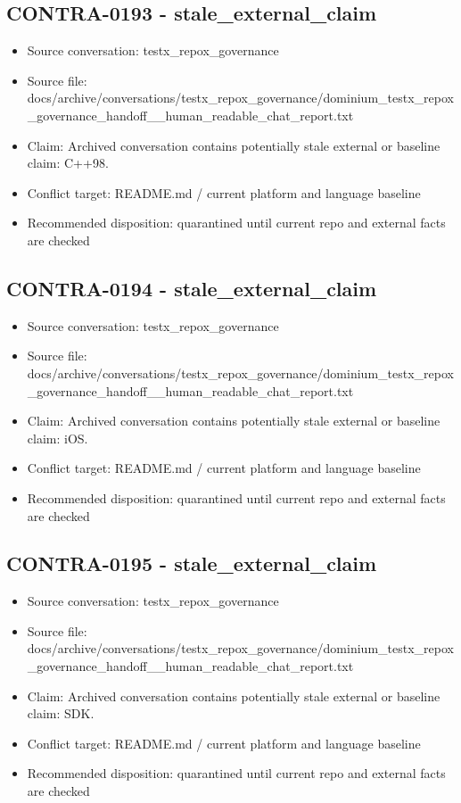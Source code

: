 \documentclass[11pt,a4paper]{report}
\begin{document}
\subsection{CONTRA-0193 - stale\_external\_claim}

\begin{itemize}
\item Source conversation: testx\_repox\_governance
\item Source file: docs/archive/conversations/testx\_repox\_governance/dominium\_testx\_repox\_governance\_handoff\_\_human\_readable\_chat\_report.txt
\item Claim: Archived conversation contains potentially stale external or baseline claim: C++98.
\item Conflict target: README.md / current platform and language baseline
\item Recommended disposition: quarantined until current repo and external facts are checked
\end{itemize}

\subsection{CONTRA-0194 - stale\_external\_claim}

\begin{itemize}
\item Source conversation: testx\_repox\_governance
\item Source file: docs/archive/conversations/testx\_repox\_governance/dominium\_testx\_repox\_governance\_handoff\_\_human\_readable\_chat\_report.txt
\item Claim: Archived conversation contains potentially stale external or baseline claim: iOS.
\item Conflict target: README.md / current platform and language baseline
\item Recommended disposition: quarantined until current repo and external facts are checked
\end{itemize}

\subsection{CONTRA-0195 - stale\_external\_claim}

\begin{itemize}
\item Source conversation: testx\_repox\_governance
\item Source file: docs/archive/conversations/testx\_repox\_governance/dominium\_testx\_repox\_governance\_handoff\_\_human\_readable\_chat\_report.txt
\item Claim: Archived conversation contains potentially stale external or baseline claim: SDK.
\item Conflict target: README.md / current platform and language baseline
\item Recommended disposition: quarantined until current repo and external facts are checked
\end{itemize}
\end{document}
